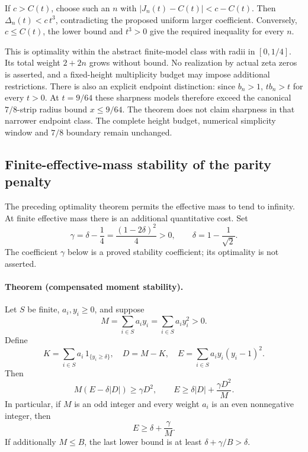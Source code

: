 If \(c>C(t)\), choose such an \(n\) with
\(|J_n(t)-C(t)|<c-C(t)\).  Then
\(\Delta_n(t)<c\,t^3\), contradicting the proposed uniform
larger coefficient.  Conversely, \(c\le C(t)\), the lower bound
and \(t^3>0\) give the required inequality for every \(n\).

This is optimality within the abstract finite-model class with radii
in \([0,1/4]\).  Its total weight \(2+2n\) grows without bound.
No realization by actual zeta zeros is asserted, and a fixed-height
multiplicity budget may impose additional restrictions.
There is also an explicit endpoint distinction: since \(b_n>1\),
\(tb_n>t\) for every \(t>0\).  At \(t=9/64\) these sharpness models
therefore exceed the canonical \(7/8\)-strip radius bound \(x\le9/64\).
The theorem does not claim sharpness in that narrower endpoint class.
The complete height budget, numerical simplicity window and
\(7/8\) boundary remain unchanged.

\subsection{Finite-effective-mass stability of the parity penalty}
\label{sec:finite-mass-parity-stability}

The preceding optimality theorem permits the effective mass to tend
to infinity.  At finite effective mass there is an additional
quantitative cost.  Set
\[
 \gamma=\delta-\frac14=\frac{(1-2\delta)^2}{4}>0,
 \qquad
 \delta=1-\frac1{\sqrt2}.
\]
The coefficient \(\gamma\) below is a proved stability coefficient;
its optimality is not asserted.

\paragraph{Theorem (compensated moment stability).}
Let \(S\) be finite, \(a_i,y_i\ge0\), and suppose
\[
 M=\sum_{i\in S}a_i y_i=\sum_{i\in S}a_i y_i^2>0.
\]
Define
\[
 K=\sum_{i\in S}a_i\,1_{\{y_i\ge\delta\}},\quad
 D=M-K,\quad E=\sum_{i\in S}a_i y_i(y_i-1)^2.
\]
Then
\begin{equation}
 M(E-\delta|D|)\ge\gamma D^2,\qquad
 E\ge\delta|D|+\frac{\gamma D^2}{M}.
 \label{eq:finite-mass-stability}
\end{equation}
In particular, if \(M\) is an odd integer and every weight \(a_i\)
is an even nonnegative integer, then
\[
 E\ge\delta+\frac{\gamma}{M}.
\]
If additionally \(M\le B\), the last lower bound is at least
\(\delta+\gamma/B>\delta\).

